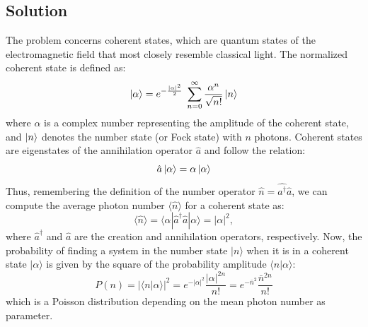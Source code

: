\documentclass[prl, 11 pt]{revtex4-2}
\begin{document}
\subsection{Solution}
The problem concerns coherent states, which are quantum states of the electromagnetic field that most closely resemble classical light. The normalized coherent state is defined as:
%
\begin{equation}
    \label{eq:coherent_state_def}
    \ket{\alpha} = e^{-\frac{|\alpha|^2}{2}}\;\sum_{n=0}^\infty\frac{\alpha^n}{\sqrt{n!}}\ket{n}
\end{equation}
%
where $\alpha$ is a complex number representing the amplitude of the coherent state, and $\ket{n}$ denotes the number state (or Fock state) with $n$ photons. Coherent states are eigenstates of the annihilation operator $\hat{a}$ and follow the relation:
%
\begin{equation}
    \label{eq:a_eigenstates}
    \hat{a}\ket{\alpha} =\alpha\ket{\alpha}
\end{equation}
%
Thus, remembering the definition of the number operator $\hat{n} = \hat{a^\dagger} \hat{a}$, we can compute the average photon number $\langle \hat{n} \rangle$ for a coherent state as:
%
\begin{equation}
    \label{eq:avg_photon_number}
    \langle \hat{n} \rangle = \langle \alpha | \hat{a}^\dagger \hat{a} | \alpha \rangle = |\alpha|^2,  
\end{equation}
%
where \( \hat{a}^\dagger \) and \( \hat{a} \) are the creation and annihilation operators, respectively. Now, the probability of finding a system in the number state $|n\rangle$ when it is in a coherent state $|\alpha\rangle$ is given by the square of the probability amplitude $\langle n|\alpha\rangle$:
%
\begin{equation}
    P(n) = |\langle n|\alpha \rangle|^2 = e^{-\left|\alpha\right|^2} \frac{|\alpha|^{2n}}{n!} = e^{-\bar{n}^2} \frac{\bar{n}^{2n}}{n!}
\end{equation}
%
which is a Poisson distribution depending on the mean photon number as parameter.
\end{document}
